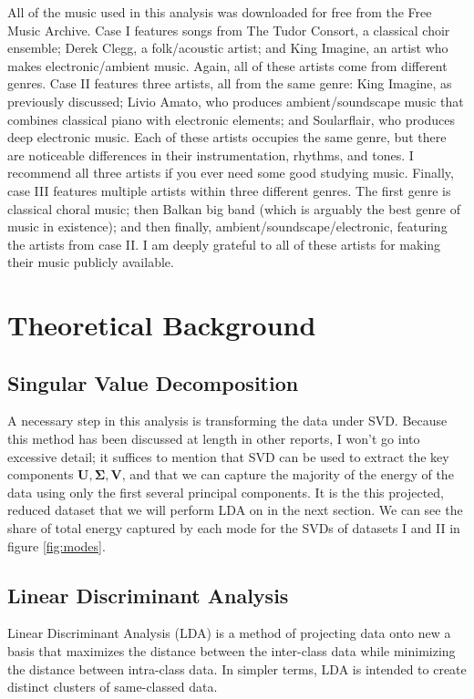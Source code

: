 \documentclass[a4paper,10 pt]{article}
\begin{document}
All of the music used in this analysis was downloaded for free from the Free Music Archive. Case I features songs from The Tudor Consort, a classical choir ensemble; Derek Clegg, a folk/acoustic artist; and King Imagine, an artist who makes electronic/ambient music. Again, all of these artists come from different genres. Case II features three artists, all from the same genre: King Imagine, as previously discussed; Livio Amato, who produces ambient/soundscape music that combines classical piano with electronic elements; and Soularflair, who produces deep electronic music. Each of these artists occupies the same genre, but there are noticeable differences in their instrumentation, rhythms, and tones. I recommend all three artists if you ever need some good studying music. Finally, case III features multiple artists within three different genres. The first genre is classical choral music; then Balkan big band (which is arguably the best genre of music in existence); and then finally, ambient/soundscape/electronic, featuring the artists from case II. I am deeply grateful to all of these artists for making their music publicly available.




\section{Theoretical Background}
\subsection{Singular Value Decomposition}
A necessary step in this analysis is transforming the data under SVD. Because this method has been discussed at length in other reports, I won't go into excessive detail; it suffices to mention that SVD can be used to extract the key components $\mathbf{U},\mathbf{\Sigma},\mathbf{V}$, and that we can capture the majority of the energy of the data using only the first several principal components. It is the this projected, reduced dataset that we will perform LDA on in the next section. We can see the share of total energy captured by each mode for the SVDs of datasets I and II in figure \ref{fig:modes}.

\subsection{Linear Discriminant Analysis}
Linear Discriminant Analysis (LDA) is a method of projecting data onto new a basis that maximizes the distance between the inter-class data while minimizing the distance between intra-class data. In simpler terms, LDA is intended to create distinct clusters of same-classed data.
\end{document}
